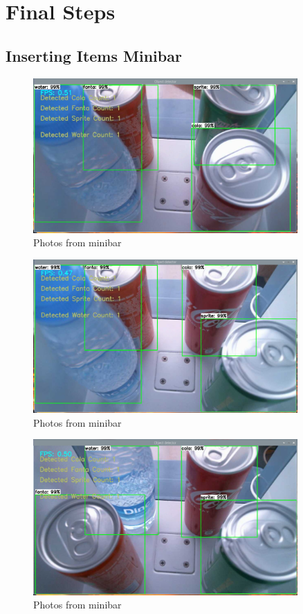 \chapter{Final Steps}

\section{Inserting Items Minibar}

\begin{figure}[!htbp]
    \centering
    \includegraphics[width=0.9\textwidth]{Imgs/rapor1.PNG}
    \caption{\label{fig:minibar}Photos from minibar}
\end{figure}

\begin{figure}[!htbp]
    \centering
    \includegraphics[width=0.9\textwidth]{Imgs/rapor2.PNG}
    \caption{\label{fig:minibar}Photos from minibar}
\end{figure}

\begin{figure}[!htbp]
    \centering
    \includegraphics[width=0.9\textwidth]{Imgs/rapor3.PNG}
    \caption{\label{fig:minibar}Photos from minibar}
\end{figure}

